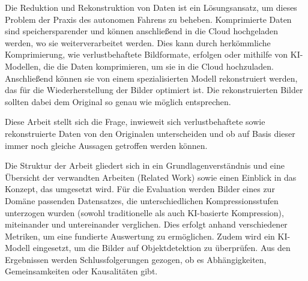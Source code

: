 \newpage 
    Die Reduktion und Rekonstruktion von Daten ist ein Lösungsansatz, um dieses Problem der Praxis des autonomen Fahrens zu beheben.
    Komprimierte Daten sind speichersparender und können anschließend in die Cloud hochgeladen werden, wo sie weiterverarbeitet werden.
    Dies kann durch herkömmliche Komprimierung, wie verlustbehaftete Bildformate, erfolgen oder mithilfe von KI-Modellen, die die Daten komprimieren, um sie in die Cloud hochzuladen. Anschließend können sie von einem spezialisierten Modell rekonstruiert werden, das für die Wiederherstellung der Bilder optimiert ist. Die rekonstruierten Bilder sollten dabei dem Original so genau wie möglich entsprechen.

    Diese Arbeit stellt sich die Frage, inwieweit sich verlustbehaftete sowie rekonstruierte Daten von den Originalen unterscheiden und ob auf Basis dieser immer noch gleiche Aussagen getroffen werden können.

    Die Struktur der Arbeit gliedert sich in ein Grundlagenverständnis und eine Übersicht der verwandten Arbeiten (Related Work) sowie einen Einblick in das Konzept, das umgesetzt wird. Für die Evaluation werden Bilder eines zur Domäne passenden Datensatzes, die unterschiedlichen Kompressionsstufen unterzogen wurden (sowohl traditionelle als auch KI-basierte Kompression), miteinander und untereinander verglichen. Dies erfolgt anhand verschiedener Metriken, um eine fundierte Auswertung zu ermöglichen. Zudem wird ein KI-Modell eingesetzt, um die Bilder auf Objektdetektion zu überprüfen. Aus den Ergebnissen werden Schlussfolgerungen gezogen, ob es Abhängigkeiten, Gemeinsamkeiten oder Kausalitäten gibt.
